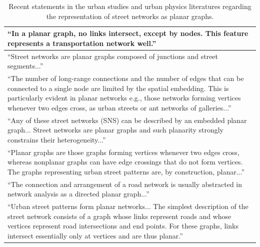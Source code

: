 \documentclass[Afour,sageh,times]{sagej}
\begin{document}
\begin{table}[htbp]
\centering
\caption{Recent statements in the urban studies and urban physics literatures regarding the representation of street networks as planar graphs.}
\label{table:planar_quotes}
\begin{tabular}{ | p{} | }
\toprule

\enquote{In a planar graph, no links intersect, except by nodes. This feature represents a transportation network well.} \citep[p.~6]{dill_measuring_2004} \\ \hline

\enquote{Street networks are planar graphs composed of junctions and street segments...} \citep[p.~18]{batty_network_2005} \\ \hline

\enquote{The number of long-range connections and the number of edges that can be connected to a single node are limited by the spatial embedding. This is particularly evident in planar networks e.g., those networks forming vertices whenever two edges cross, as urban streets or ant networks of galleries...} \citep[p.~1]{crucitti_centrality_2006} \\ \hline

\enquote{Any of these street networks (SNS) can be described by an embedded planar graph... Street networks are planar graphs and such planarity strongly constrains their heterogeneity...} \citep[pp.~514~\&~521]{buhl_topological_2006} \\ \hline

\enquote{Planar graphs are those graphs forming vertices whenever two edges cross, whereas nonplanar graphs can have edge crossings that do not form vertices. The graphs representing urban street patterns are, by construction, planar...} \citep[p.~3]{cardillo_structural_2006} \\ \hline

\enquote{The connection and arrangement of a road network is usually abstracted in network analysis as a directed planar graph...} \citep[p.~340]{xie_measuring_2007} \\ \hline

\enquote{Urban street patterns form planar networks... The simplest description of the street network consists of a graph whose links represent roads and whose vertices represent road intersections and end points. For these graphs, links intersect essentially only at vertices and are thus planar.} \citep[p.~1]{barthelemy_modeling_2008} \\ \hline


\end{tabular}
\end{table}
\end{document}
